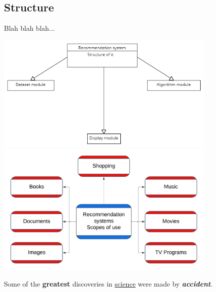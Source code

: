 \documentclass[10pt,twoside,english,a4paper]{article}
\begin{document}
\subsection{Structure}
Blah blah blah...
\begin{center}


\includegraphics[width=0.8\textwidth]{system_structure}
\includegraphics[width=0.8\textwidth]{system_types}


\end{center}
Some of the \textbf{greatest}
discoveries in \underline{science} 
were made by \textbf{\textit{accident}}.




\end{document}
